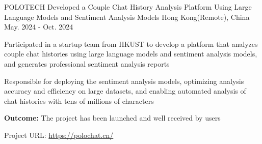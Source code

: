 
\newcommand{\expaddspace}[0]{
  \vspace{5.5mm}
}


\begin{cventries}

  \cventry
  {POLOTECH}
  {Developed a Couple Chat History Analysis Platform Using Large Language Models and Sentiment Analysis Models}
  {Hong Kong(Remote), China}
  {May. 2024 - Oct. 2024}
  {
    \begin{cvitems}
      \item {Participated in a startup team from HKUST to develop a platform that analyzes couple chat histories using large language models and sentiment analysis models, and generates professional sentiment analysis reports}
      \item {Responsible for deploying the sentiment analysis models, optimizing analysis accuracy and efficiency on large datasets, and enabling automated analysis of chat histories with tens of millions of characters}
      \item {\textbf{Outcome:} The project has been launched and well received by users}
      \item {Project URL: \href{https://polochat.cn/}{https://polochat.cn/}}
    \end{cvitems}
  }
  \expsaddspace

\end{cventries}
